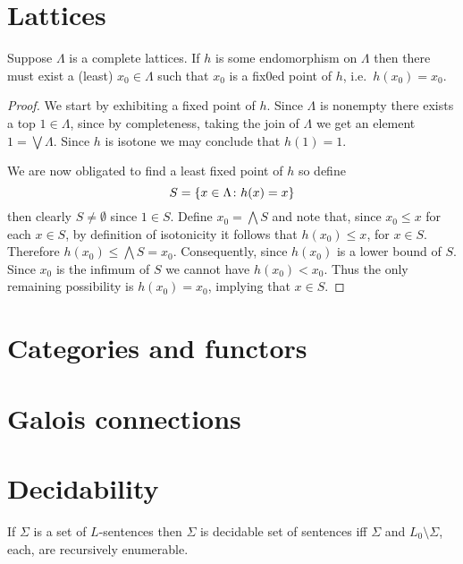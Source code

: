 \section{Lattices}

\begin{thm}
	Suppose $\Lambda$ is a complete lattices.  If $h$ is some endomorphism on $\Lambda$ then there must exist a (least) $x_0\in \Lambda$ such that $x_0$ is a fix0ed point of $h$, i.e.\ $h(x_0)=x_0$.
\end{thm}
\begin{proof}
	We start by exhibiting a fixed point of $h$.  Since $\Lambda$ is nonempty there exists a top $1\in\Lambda$, since by completeness, taking the join of $\Lambda$ we get an element $1=\bigvee\Lambda$.  Since $h$ is isotone we may conclude that $h(1)=1$.

	We are now obligated to find a least fixed point of $h$ so define
	\begin{equation}
		S=\left\lbrace x\in\Lambda\colon h(x)=x \right\rbrace
	\end{equation}  then clearly $S\neq\emptyset$ since $1\in S$.  Define $x_0=\bigwedge S$ and note that, since $x_0\leq x$ for each $x\in S$, by definition of isotonicity it follows that $h(x_0)\leq x$, for $x\in S$. Therefore $h(x_0)\leq\bigwedge S=x_0$.  Consequently, since $h(x_0)$ is a lower bound of $S$.  Since $x_0$ is the infimum of $S$ we cannot have $h(x_0)<x_0$.  Thus the only remaining possibility is $h(x_0)=x_0$, implying that $x\in S$.
\end{proof}


\section{Categories and functors}


\section{Galois connections}



\section{Decidability}

	\begin{prp}
		If $\Sigma$ is a set of $L$-sentences then $\Sigma$ is decidable set of sentences iff $\Sigma$ and $L_0\setminus\Sigma$, each, are recursively enumerable.
	\end{prp}

